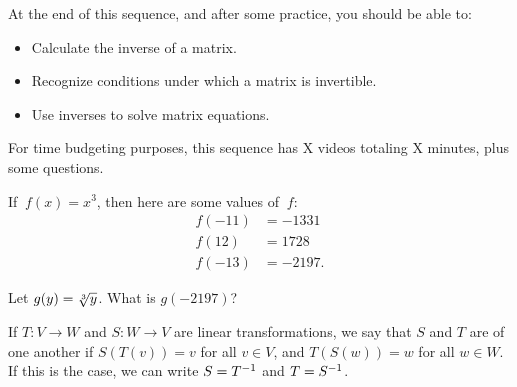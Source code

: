







At the end of this sequence, and after some practice, you should be able to:

\begin{itemize}
\item Calculate the inverse of a matrix.  
\item Recognize conditions under which a matrix is invertible.   
\item Use inverses to solve matrix equations.  
\end{itemize}


For time budgeting purposes, this sequence has X videos totaling X minutes, 
plus some questions.  




\endedxtext

\endedxvertical





If $\ f(x) = x^3$, then here are some values of $\ f$:
\begin{align*} f(-11) &= -1331 \\ f(12) &= 1728 \\  f(-13) &= -2197. \end{align*}  

Let $g(y) = \displaystyle{\sqrt[3]{y}}$.  What is $g(-2197)$?



\endedxproblem



\endedxvertical





{}  
If $T: V \rightarrow W$ and $S: W \rightarrow V$ are linear transformations, we say that
$S$ and $T$ are {} of one another if $S(T(v)) = v$ for all $v\in V$, and
$T(S(w)) = w$ for all $w\in W$.  If this is the case, we can write $S = T^{-1}$ and $T = S^{-1}$.  

